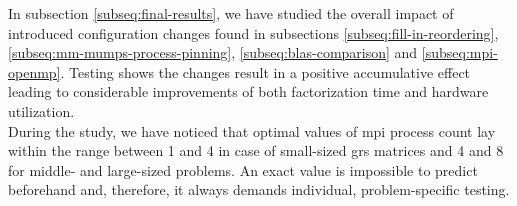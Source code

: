 



In subsection \ref{subseq:final-results}, we have studied the overall impact of introduced configuration changes found in subsections \ref{subseq:fill-in-reordering}, \ref{subseq:mm-mumps-process-pinning}, \ref{subseq:blas-comparison} and \ref{subseq:mpi-openmp}. Testing shows the changes result in a positive accumulative effect leading to considerable improvements of both factorization time and hardware utilization.\\



During the study, we have noticed that optimal values of \acrshort{mpi} process count lay within the range between 1 and 4 in case of small-sized \acrshort{grs} matrices and 4 and 8 for middle- and large-sized problems. An exact value is impossible to predict beforehand and, therefore, it always demands individual, problem-specific testing.\\

